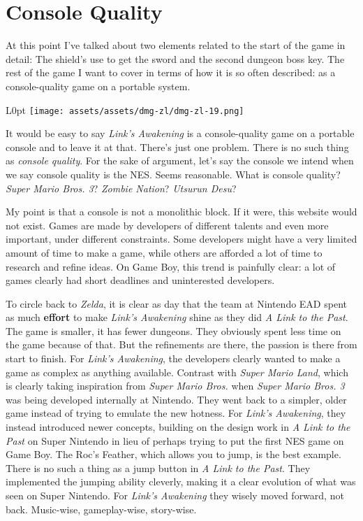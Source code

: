 \documentclass{book}
\begin{document}
\FloatBarrier\needspace{10mm}\section*{Console Quality}\nopagebreak[4]

At this point I’ve talked about two elements related to the start of the game in detail: The shield’s use to get the sword and the second dungeon boss key. The rest of the game I want to cover in terms of how it is so often described: as a console-quality game on a portable system.

\begin{wrapfigure}{L}{0pt} \texttt{[image: assets/assets/dmg-zl/dmg-zl-19.png]}\end{wrapfigure}
It would be easy to say \emph{Link’s Awakening} is a console-quality game on a portable console and to leave it at that. There’s just one problem. There is no such thing as \emph{console quality}. For the sake of argument, let’s say the console we intend when we say console quality is the NES. Seems reasonable. What is console quality? \emph{Super Mario Bros. 3}? \emph{Zombie Nation}? \emph{Utsurun Desu}?

My point is that a console is not a monolithic block. If it were, this website would not exist. Games are made by developers of different talents and even more important, under different constraints. Some developers might have a very limited amount of time to make a game, while others are afforded a lot of time to research and refine ideas. On Game Boy, this trend is painfully clear: a lot of games clearly had short deadlines and uninterested developers.

To circle back to \emph{Zelda}, it is clear as day that the team at Nintendo EAD spent as much \textbf{effort} to make \emph{Link’s Awakening} shine as they did \emph{A Link to the Past}. The game is smaller, it has fewer dungeons. They obviously spent less time on the game because of that. But the refinements are there, the passion is there from start to finish. For \emph{Link’s Awakening}, the developers clearly wanted to make a game as complex as anything available. Contrast with \emph{Super Mario Land}, which is clearly taking inspiration from \emph{Super Mario Bros.} when \emph{Super Mario Bros. 3} was being developed internally at Nintendo. They went back to a simpler, older game instead of trying to emulate the new hotness. For \emph{Link’s Awakening}, they instead introduced newer concepts, building on the design work in \emph{A Link to the Past} on Super Nintendo in lieu of perhaps trying to put the first NES game on Game Boy. The Roc’s Feather, which allows you to jump, is the best example. There is no such a thing as a jump button in \emph{A Link to the Past}. They implemented the jumping ability cleverly, making it a clear evolution of what was seen on Super Nintendo. For \emph{Link’s Awakening} they wisely moved forward, not back. Music-wise, gameplay-wise, story-wise.
\end{document}
